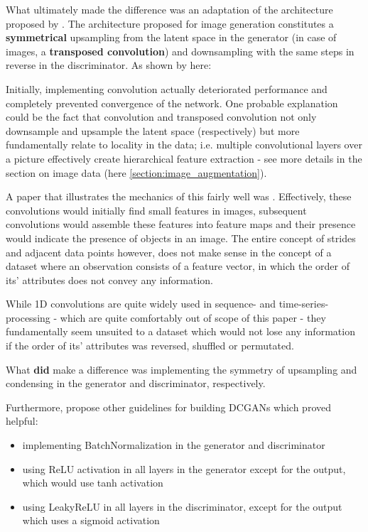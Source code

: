 \pagebreak

What ultimately made the difference was an adaptation of the architecture proposed by \cite{dcgan}. The architecture proposed for image generation constitutes a \textbf{symmetrical} upsampling from the latent space in the generator (in case of images, a \textbf{transposed convolution}) and downsampling with the same steps in reverse in the discriminator. As shown by \cite{oversampling_gan} here:


Initially, implementing convolution actually deteriorated performance and completely prevented convergence of the network. One probable explanation could be the fact that convolution and transposed convolution not only downsample and upsample the latent space (respectively) but more fundamentally relate to locality in the data; i.e. multiple convolutional layers over a picture effectively create hierarchical feature extraction - see more details in the section on image data (here \ref{section:image_augmentation}). 

A paper that illustrates the mechanics of this fairly well was \cite{convolution_arithmetic}. Effectively, these convolutions would initially find small features in images, subsequent convolutions would assemble these features into feature maps and their presence would indicate the presence of objects in an image. The entire concept of strides and adjacent data points however, does not make sense in the concept of a dataset where an observation consists of a feature vector, in which the order of its' attributes does not convey any information. 

\pagebreak

While 1D convolutions are quite widely used in sequence- and time-series-processing - which are quite comfortably out of scope of this paper - they fundamentally seem unsuited to a dataset which would not lose any information if the order of its' attributes was reversed, shuffled or permutated.

What \textbf{did} make a difference was implementing the symmetry of upsampling and condensing in the generator and discriminator, respectively.

Furthermore, \cite{dcgan} propose other guidelines for building \acp{DCGAN} which proved helpful:

\begin{itemize}
	\item implementing BatchNormalization in the generator and discriminator \cite{batchnorm}
	\item using ReLU activation in all layers in the generator except for the output, which would use tanh activation
	\item using LeakyReLU in all layers in the discriminator, except for the output which uses a sigmoid activation
\end{itemize}

